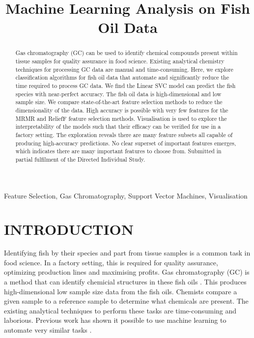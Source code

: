\documentclass{article}
\title{Machine Learning Analysis on Fish Oil Data }
\begin{document}
\maketitle
%
\begin{abstract}

  Gas chromatography (GC) can be used to identify chemical compounds present within tissue samples for quality assurance in food science.
  Existing analytical chemistry techniques for processing GC data are manual and time-consuming.
  Here, we explore classification algorithms for fish oil data that automate and significantly reduce the time required to process GC data.
  We find the Linear SVC model can predict the fish species with near-perfect accuracy.
  The fish oil data is high-dimensional and low sample size.
  We compare state-of-the-art feature selection methods to reduce the dimensionality of the data.
  High accuracy is possible with very few features for the MRMR and ReliefF feature selection methods.
  Visualisation is used to explore the interpretability of the models such that their efficacy can be verified for use in a factory setting.
  The exploration reveals there are many feature subsets all capable of producing high-accuracy predictions.
  No clear superset of important features emerges, which indicates there are many important features to choose from.
  Submitted in partial fulfilment of the Directed Individual Study.

\end{abstract}
%
\begin{keywords}
  Feature Selection, Gas Chromatography, Support Vector Machines, Visualisation
\end{keywords}
%

\section{INTRODUCTION}
\label{sec:introduction}

Identifying fish by their species and part from tissue samples is a common task in food science.
In a factory setting, this is required for quality assurance, optimizing production lines and maximising profits.
Gas chromatography (GC) \cite{eder1995gas} is a method that can identify chemicial structures in these fish oils \cite{restek2018high}.
This produces high-dimensional low sample size data from the fish oils.
Chemists compare a given sample to a reference sample to determine what chemicals are present.
The existing analytical techniques to perform these tasks are time-consuming and laborious.
Previous work has shown it possible to use machine learning to automate very similar tasks \cite{bi2020gc, matyushin2020gas}.
\end{document}
